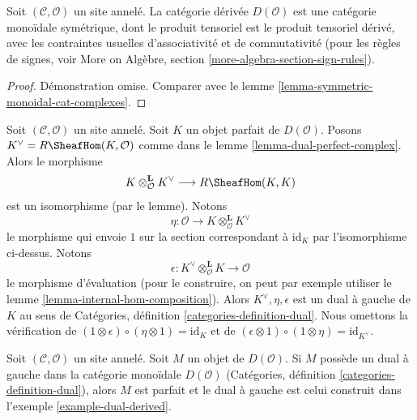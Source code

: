 \begin{lemma}
\label{lemma-symmetric-monoidal-derived}
Soit $(\mathcal{C}, \mathcal{O})$ un site annelé. La catégorie dérivée
$D(\mathcal{O})$ est une catégorie monoïdale symétrique, dont le produit
tensoriel est le produit tensoriel dérivé, avec les contraintes usuelles
d'associativité et de commutativité (pour les règles de signes, voir More on
Algèbre, section \ref{more-algebra-section-sign-rules}).
\end{lemma}

\begin{proof}
Démonstration omise. Comparer avec le lemme
\ref{lemma-symmetric-monoidal-cat-complexes}.
\end{proof}

\begin{example}
\label{example-dual-derived}
Soit $(\mathcal{C}, \mathcal{O})$ un site annelé. Soit $K$ un objet parfait
de $D(\mathcal{O})$. Posons $K^\vee = R\SheafHom(K, \mathcal{O})$ comme dans
le lemme \ref{lemma-dual-perfect-complex}. Alors le morphisme
$$
K \otimes_\mathcal{O}^\mathbf{L} K^\vee \longrightarrow R\SheafHom(K, K)
$$
est un isomorphisme (par le lemme). Notons
$$
\eta :
\mathcal{O}
\longrightarrow
K \otimes_\mathcal{O}^\mathbf{L} K^\vee
$$
le morphisme qui envoie $1$ sur la section correspondant à $\text{id}_K$
par l'isomorphisme ci-dessus. Notons
$$
\epsilon : 
K^\vee
\otimes_\mathcal{O}^\mathbf{L} K
\longrightarrow
\mathcal{O}
$$
le morphisme d'évaluation (pour le construire, on peut par exemple utiliser
le lemme \ref{lemma-internal-hom-composition}). Alors
$K^\vee, \eta, \epsilon$ est un dual à gauche de $K$ au sens de Catégories,
définition \ref{categories-definition-dual}. Nous omettons la vérification de
$(1 \otimes \epsilon) \circ (\eta \otimes 1) = \text{id}_K$
et de
$(\epsilon \otimes 1) \circ (1 \otimes \eta) =
\text{id}_{K^\vee}$.
\end{example}

\begin{lemma}
\label{lemma-left-dual-derived}
Soit $(\mathcal{C}, \mathcal{O})$ un site annelé. Soit $M$ un objet de
$D(\mathcal{O})$. Si $M$ possède un dual à gauche dans la catégorie monoïdale
$D(\mathcal{O})$ (Catégories, définition
\ref{categories-definition-dual}), alors $M$ est parfait et le dual à gauche
est celui construit dans l'exemple \ref{example-dual-derived}.
\end{lemma}

